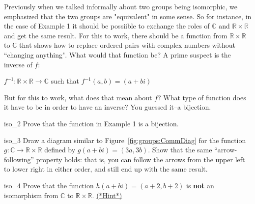 Previously when we talked informally about two groups being isomorphic, we emphasized that  the two groups are "equivalent"  in some sense.  So for instance, in the case of Example 1 it should be possiible to exchange the roles of  ${\mathbb C}$ and ${\mathbb R} \times {\mathbb R}$ and get the same result.  For this to work, there should  be a function from ${\mathbb R} \times {\mathbb R}$ to ${\mathbb C}$  that shows how to replace ordered pairs with complex numbers without ``changing anything".  What would that function be?  A prime suspect is the inverse of $f$:

\begin{center}
$f^{-1} : {\mathbb R} \times {\mathbb R} \longrightarrow {\mathbb C}$ such that $f^{-1}(a,b) = (a + bi)$
\end{center}

But for this to work,  what does that mean about $f$?  What type of function does it have to be in order to have an inverse?  You guessed it--a bijection.

\begin{exercise}{iso_2}
Prove that the function in Example 1 is a bijection.
\end{exercise}

\begin{exercise}{iso_3} 
Draw a diagram similar to Figure~\ref{fig:groups:CommDiag}  for the function $g: {\mathbb C} \rightarrow {\mathbb R} \times {\mathbb R}$ defined by $g(a + bi) = (3a, 3b)$. Show that the same ``arrow-following'' property holds: that is, you can follow the arrows from the upper left to lower right in either order, and still end up with the same result.
\end{exercise} 

\begin{exercise}{iso_4}
Prove that the function $h(a + bi) = (a+2, b+2)$ is {\bf not} an isomorphism from ${\mathbb C}$ to  ${\mathbb R} \times {\mathbb R}$.
\hyperref[sec:isomorph:hints]{(*Hint*)}
 \end{exercise}



